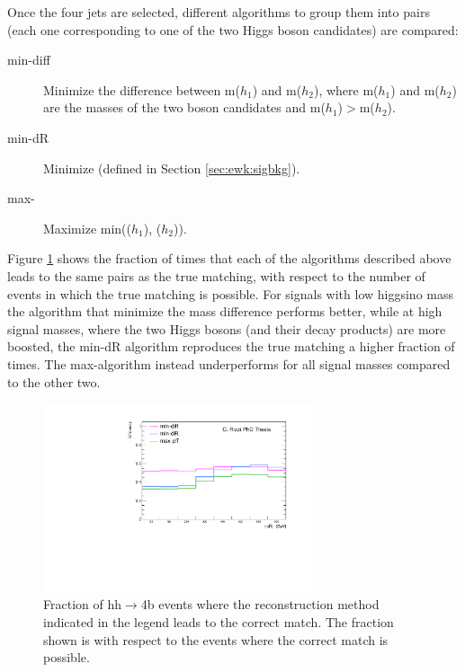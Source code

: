 Once the four jets are selected, 
different algorithms to group them into pairs (each one corresponding to one of the two Higgs boson candidates) 
are compared: 

\begin{description}
\item[min-diff] Minimize the difference between m($h_1$)  and m($h_2$), where m($h_1$) and m($h_2$) are the masses of the two boson candidates and 
m($h_1$)$>$m($h_2$).
\item[min-dR] Minimize \dRmax (defined in Section \ref{sec:ewk:sigbkg}).
\item[max-\pt] Maximize min(\pt($h_1$), \pt($h_2$)).
\end{description}


Figure \ref{fig:h_reco_best_match} shows the fraction of times that each of the algorithms 
described above leads to the same pairs as the true matching, with respect to the number of events in which the true matching is possible. 
For signals with low higgsino mass the algorithm that minimize the mass difference performs better, 
while at high signal masses, where the two Higgs bosons (and their decay products) are more boosted, 
the min-dR algorithm reproduces the true matching a higher fraction of times. 
The max-\pt algorithm instead underperforms for all signal masses compared to the other 
two. 

\begin{figure}[h]
\centering
\includegraphics[width=0.7\textwidth]{figures/h_reco/best_match_if_match_possible.pdf}
\caption{Fraction of hh$\to$4b events where the reconstruction method indicated in the legend leads to the correct match. The fraction shown is with respect to the events where the correct match is possible.}
\label{fig:h_reco_best_match}
\end{figure}

